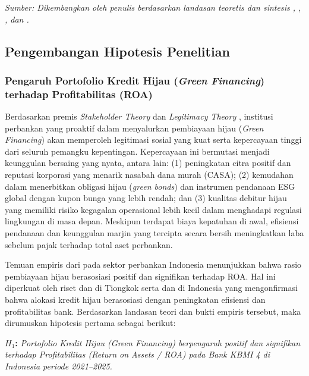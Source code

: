 \documentclass[12pt,a4paper]{article}
\numberwithin{equation}{section}
\begin{document}
\noindent \textit{Sumber: Dikembangkan oleh penulis berdasarkan landasan teoretis dan sintesis \citet{Pramono2022}, \citet{Yin2021}, \citet{KuncoroSuhardjono2018}, dan \citet{BrighamEhrhardt2020}.}

\subsection{Pengembangan Hipotesis Penelitian}

\subsubsection{Pengaruh Portofolio Kredit Hijau (\emph{Green Financing}) terhadap Profitabilitas (ROA)}
\noindent
Berdasarkan premis \emph{Stakeholder Theory} \citep{Freeman2010} dan \emph{Legitimacy Theory} \citep{Suchman1995}, institusi perbankan yang proaktif dalam menyalurkan pembiayaan hijau (\emph{Green Financing}) akan memperoleh legitimasi sosial yang kuat serta kepercayaan tinggi dari seluruh pemangku kepentingan. Kepercayaan ini bermutasi menjadi keunggulan bersaing yang nyata, antara lain: (1) peningkatan citra positif dan reputasi korporasi yang menarik nasabah dana murah (CASA); (2) kemudahan dalam menerbitkan obligasi hijau (\emph{green bonds}) dan instrumen pendanaan ESG global dengan kupon bunga yang lebih rendah; dan (3) kualitas debitur hijau yang memiliki risiko kegagalan operasional lebih kecil dalam menghadapi regulasi lingkungan di masa depan. Meskipun terdapat biaya kepatuhan di awal, efisiensi pendanaan dan keunggulan marjin yang tercipta secara bersih meningkatkan laba sebelum pajak terhadap total aset perbankan.

\noindent
Temuan empiris dari \citet{Pramono2022} pada sektor perbankan Indonesia menunjukkan bahwa rasio pembiayaan hijau berasosiasi positif dan signifikan terhadap ROA. Hal ini diperkuat oleh riset \citet{Yin2021} dan \citet{Sun2021} di Tiongkok serta \citet{SariAstuti2023} dan \citet{WulandariRahardjo2022} di Indonesia yang mengonfirmasi bahwa alokasi kredit hijau berasosiasi dengan peningkatan efisiensi dan profitabilitas bank. Berdasarkan landasan teori dan bukti empiris tersebut, maka dirumuskan hipotesis pertama sebagai berikut:

\vspace{0.2cm}
\noindent \textbf{$H_1$:} \emph{Portofolio Kredit Hijau (Green Financing) berpengaruh positif dan signifikan terhadap Profitabilitas (Return on Assets / ROA) pada Bank KBMI 4 di Indonesia periode 2021--2025.}
\end{document}
